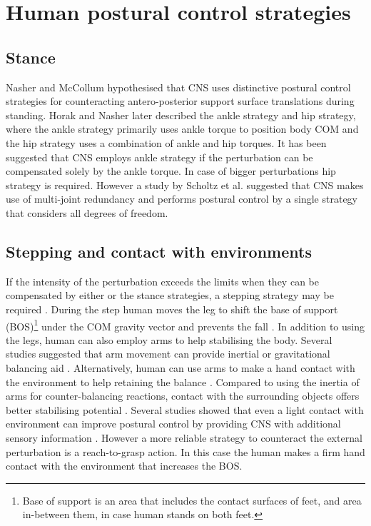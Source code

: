\documentclass[12pt,a4paper,twoside]{article}
\begin{document}
\section{{Human postural control strategies}}
\subsection{{Stance}}
Nasher and McCollum \cite{Nashner1985} hypothesised that CNS uses distinctive postural control strategies for counteracting antero-posterior support surface translations during standing. Horak and Nasher \cite{Horak1986} later described the ankle strategy and hip strategy, where the ankle strategy primarily uses ankle torque to position body COM and the hip strategy uses a combination of ankle and hip torques. It has been suggested that CNS employs ankle strategy if the perturbation can be compensated solely by the ankle torque. In case of bigger perturbations hip strategy is required. However a study by Scholtz et al. \cite{Scholz2007} suggested that CNS makes use of multi-joint redundancy and performs postural control by a single strategy that considers all degrees of freedom.

\subsection{{Stepping and contact with environments}}
If the intensity of the perturbation exceeds the limits when they can be compensated by either or the stance strategies, a stepping strategy may be required \cite{Lee2014, Horak1986, Mcllroy1995}. During the step human moves the leg to shift the base of support (BOS)\footnote{Base of support is an area that includes the contact surfaces of feet, and area in-between them, in case human stands on both feet.} under the COM gravity vector and prevents the fall \cite{Maki1997}. In addition to using the legs, human can also employ arms to help stabilising the body. Several studies suggested that arm movement can provide inertial or gravitational balancing aid \cite{Romick-Allen1988,Allum2002}. Alternatively, human can use arms to make a hand contact with the environment to help retaining the balance \cite{Mcllroy1995b,Maki1997,Jeka1997}. Compared to using the inertia of arms for counter-balancing reactions, contact with the surrounding objects offers better stabilising potential \cite{Maki2003}. Several studies showed that even a light contact with environment can improve postural control by providing CNS with additional sensory information \cite{Jeka1997,Riley1997,Clapp1999}. However a more reliable strategy to counteract the external perturbation is a reach-to-grasp action\cite{Mcllroy1995b,Maki1997}. In this case the human makes a firm hand contact with the environment that increases the BOS.
\end{document}
